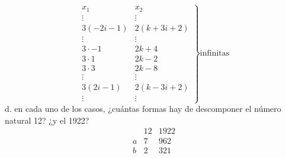\documentclass{article}
\begin{document}
$$
\left.\begin{array}{c|c}
    x_1 & x_2 \\ \hline
    \vdots & \vdots \\
    3(-2i-1) & 2(k+3i+2) \\
    \vdots & \vdots \\
    3\cdot -1 & 2k+4 \\
    3\cdot 1 & 2k-2 \\
    3\cdot 3 & 2k-8 \\
    \vdots & \vdots \\
    3(2i-1) & 2(k-3i+2) \\
    \vdots & \vdots
\end{array}\right\}\text{infinitas}
$$
d. en cada uno de los casos, ¿cuántas formas hay de descomponer el número natural 12? ¿y el 1922?
$$
\begin{array}{c|c|c}
     & 12 & 1922 \\ \hline
    a & 7 & 962 \\ \hline
    b & 2 & 321
\end{array}
$$
\newpage
\end{document}
